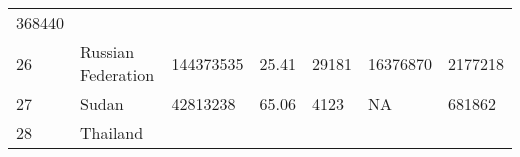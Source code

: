 \documentclass[
]{article}
\begin{document}
\begin{longtable}[]{@{}lllllll@{}}
\begin{minipage}[t]{0.12\columnwidth}
368440\strut
\end{minipage}\tabularnewline
\begin{minipage}[t]{0.06\columnwidth}\raggedright
26\strut
\end{minipage} & \begin{minipage}[t]{0.15\columnwidth}\raggedright
Russian Federation\strut
\end{minipage} & \begin{minipage}[t]{0.13\columnwidth}\raggedright
144373535\strut
\end{minipage} & \begin{minipage}[t]{0.13\columnwidth}\raggedright
25.41\strut
\end{minipage} & \begin{minipage}[t]{0.09\columnwidth}\raggedright
29181\strut
\end{minipage} & \begin{minipage}[t]{0.12\columnwidth}\raggedright
16376870\strut
\end{minipage} & \begin{minipage}[t]{0.12\columnwidth}\raggedright
2177218\strut
\end{minipage}\tabularnewline
\begin{minipage}[t]{0.06\columnwidth}\raggedright
27\strut
\end{minipage} & \begin{minipage}[t]{0.15\columnwidth}\raggedright
Sudan\strut
\end{minipage} & \begin{minipage}[t]{0.13\columnwidth}\raggedright
42813238\strut
\end{minipage} & \begin{minipage}[t]{0.13\columnwidth}\raggedright
65.06\strut
\end{minipage} & \begin{minipage}[t]{0.09\columnwidth}\raggedright
4123\strut
\end{minipage} & \begin{minipage}[t]{0.12\columnwidth}\raggedright
NA\strut
\end{minipage} & \begin{minipage}[t]{0.12\columnwidth}\raggedright
681862\strut
\end{minipage}\tabularnewline
\begin{minipage}[t]{0.06\columnwidth}\raggedright
28\strut
\end{minipage} & \begin{minipage}[t]{0.15\columnwidth}\raggedright
Thailand\strut

\end{minipage}
\end{longtable}
\end{document}
